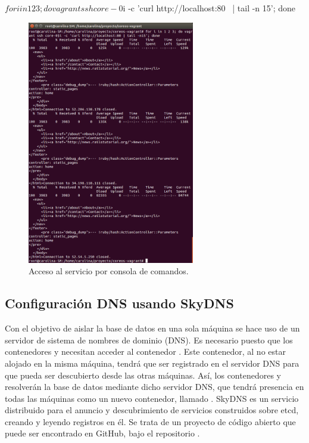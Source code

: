 \begin{code}
$ for i in 1 2 3; do vagrant ssh core-0$i -c 'curl http://localhost:80 \
  | tail -n 15'; done
\end{code}

\begin{figure}[H]
\centering
\includegraphics[width=0.65\textwidth]{images/figures/curl-fleet.png}
\caption{Acceso al servicio por consola de comandos.}
\end{figure}

\subsection{Configuración DNS usando SkyDNS}

Con el objetivo de aislar la base de datos en una sola máquina se hace uso de un servidor de sistema de nombres de dominio (DNS). Es necesario puesto que los contenedores  y  necesitan acceder al contenedor . Este contenedor, al no estar alojado en la misma máquina, tendrá que ser registrado en el servidor DNS para que pueda ser descubierto desde las otras máquinas. Así, los contenedores  y  resolverán la base de datos mediante dicho servidor DNS, que tendrá presencia en todas las máquinas como un nuevo contenedor, llamado . SkyDNS es un servicio distribuido para el anuncio y descubrimiento de servicios construidos sobre etcd, creando y leyendo registros en él. Se trata de un proyecto de código abierto que puede ser encontrado en GitHub, bajo el repositorio .

